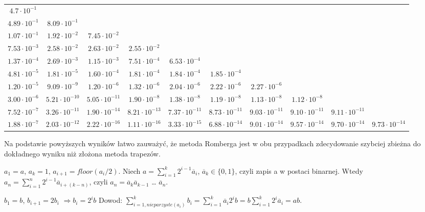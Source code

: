 \documentclass[12p]{article}
\begin{document}
\begin{center}
\begin{tabular}{|*{10}{c|}}
								\cline{1-1}
  $4.7\cdot 10^{-1}$                        \\ \cline{1-2}
  $4.89\cdot 10^{-1}$ & $8.09\cdot 10^{-1}$                 \\ \cline{1-3}
  $1.07\cdot 10^{-1}$ & $1.92\cdot 10^{-2}$ & $7.45\cdot 10^{-2}$              \\ \cline{1-4}
  $7.53\cdot 10^{-3}$ & $2.58\cdot 10^{-2}$ & $2.63\cdot 10^{-2}$ & $2.55\cdot 10^{-2}$         \\ \cline{1-5}
  $1.37\cdot 10^{-4}$ & $2.69\cdot 10^{-3}$ & $1.15\cdot 10^{-3}$ & $7.51\cdot 10^{-4}$ & $6.53\cdot 10^{-4}$     \\ \cline{1-6}
  $4.81\cdot 10^{-5}$ & $1.81\cdot 10^{-5}$ & $1.60\cdot 10^{-4}$ & $1.81\cdot 10^{-4}$ & $1.84\cdot 10^{-4}$ & $1.85\cdot 10^{-4}$ \\ \cline{1-7}
  $1.20 \cdot 10^{-5}$ & $9.09\cdot 10^{-9}$ & $ 1.20\cdot 10^{-6}$ & $ 1.32\cdot 10^{-6}$& $2.04\cdot 10^{-6}$& $2.22\cdot 10^{-6}$ & $2.27\cdot 10^{-6}$ \\ \cline{1-8}
  $ 3.00\cdot 10^{-6}$ & $5.21\cdot 10^{-10}$ & $5.05\cdot 10^{-11}$ & $1.90\cdot 10^{-8}$& $1.38\cdot 10^{-8}$& $1.19\cdot 10^{-8}$ & $1.13\cdot 10^{-8}$ & $1.12\cdot 10^{-8}$ \\ \cline{1-9}
  $ 7.52\cdot 10^{-7}$ & $3.26\cdot 10^{-11}$ & $1.90\cdot 10^{-14}$ & $8.21\cdot 10^{-13}$& $7.37\cdot 10^{-11}$& $8.73\cdot 10^{-11}$ & $9.03\cdot 10^{-11}$ & $9.10\cdot 10^{-11}$ & $9.11\cdot 10^{-11}$ \\ \hline
  $ 1.88\cdot 10^{-7}$ & $2.03\cdot 10^{-12}$ & $2.22\cdot 10^{-16}$ & $1.11\cdot 10^{-16}$& $3.33\cdot 10^{-15}$& $6.88\cdot 10^{-14}$ & $9.01\cdot 10^{-14}$ & $9.57\cdot 10^{-14}$ & $9.70\cdot 10^{-14}$ & $9.73\cdot 10^{-14}$ \\ \hline

  
\end{tabular}
\end{center}



Na podstawie powyższych wyników łatwo zauważyć, że metoda Romberga jest w obu przypadkach zdecydowanie szybciej zbieżna do dokładnego wyniku niż złożona metoda trapezów. 

$a_1 = a$, $a_k = 1$, $a_{i+1} = floor(a_i/2)$. Niech $a = \sum_{i=1}^{k}2^{i-1}\overline a_i$, $\overline a_k \in \{0,1\}$, czyli zapis a w postaci binarnej. Wtedy $a_n = \sum_{i=1}^{n}2^{i-1}\overline a_{i+(k-n)}$, czyli $a_n = \overline a_k \overline a_{k-1}$ … $\overline a_{n}$. 

$b_1 = b$, $b_{i+1} = 2b_i$ $\Rightarrow b_i = 2^ib$\newline
Dowod: $\sum_{i=1, nieparzyste(a_i)}^kb_i = \sum_{i=1}^k \overline a_i 2^i b = b \sum_{i=1}^k 2^i \overline a_i = ab.$
\end{document}
